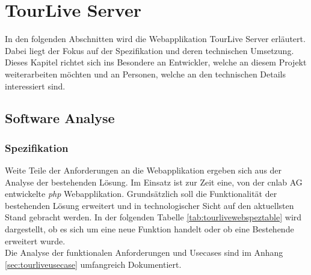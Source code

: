 \chapter{TourLive Server}
\label{sec:tourliveserver}
In den folgenden Abschnitten wird die Webapplikation TourLive Server erläutert. Dabei liegt der Fokus auf der Spezifikation und deren technischen Umsetzung. Dieses Kapitel richtet sich ins Besondere an Entwickler, welche an diesem Projekt weiterarbeiten möchten und an Personen, welche an den technischen Details interessiert sind.

\section{Software Analyse}
\subsection{Spezifikation}
Weite Teile der Anforderungen an die Webapplikation ergeben sich aus der Analyse der bestehenden Lösung. Im Einsatz ist zur Zeit eine, von der cnlab AG entwickelte \textit{\gls{php}} Webapplikation. Grundsätzlich soll die Funktionalität der bestehenden Lösung erweitert und in technologischer Sicht auf den aktuellsten Stand gebracht werden. In der folgenden Tabelle \ref{tab:tourlivewebspeztable} wird dargestellt, ob es sich um eine neue Funktion handelt oder ob eine Bestehende erweitert wurde.
\\

Die Analyse der funktionalen Anforderungen und Usecases sind im Anhang \ref{sec:tourliveusecase} umfangreich Dokumentiert.


